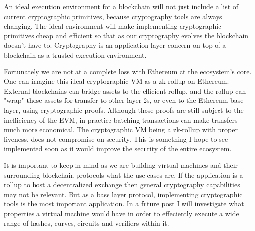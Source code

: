 An ideal execution environment for a blockchain will not just include a list of current cryptographic primitives, because cryptography tools are always changing. The ideal environment will make implementing cryptographic primitives cheap and efficient so that as our cryptography evolves the blockchain doesn't have to. Cryptography is an application layer concern on top of a blockchain-as-a-trusted-execution-environment.

Fortunately we are not at a complete loss with Ethereum at the ecosystem's core. One can imagine this ideal cryptographic VM as a zk-rollup on Ethereum. External blockchains can bridge assets to the efficient rollup, and the rollup can "wrap" those assets for transfer to other layer 2s, or even to the Ethereum base layer, using cryptographic proofs. Although those proofs are still subject to the inefficiency of the EVM, in practice batching transactions can make transfers much more economical. The cryptographic VM being a zk-rollup with proper liveness, does not compromise on security. This is something I hope to see implemented soon as it would improve the security of the entire ecosystem.

It is important to keep in mind as we are building virtual machines and their surrounding blockchain protocols what the use cases are. If the application is a rollup to host a decentralized exchange then general cryptography capabilities may not be relevant. But as a base layer protocol, implementing cryptographic tools is the most important application. In a future post I will investigate what properties a virtual machine would have in order to effeciently execute a wide range of hashes, curves, circuits and verifiers within it.
